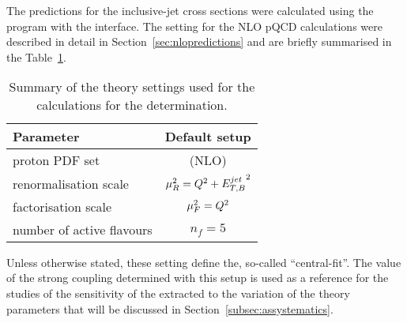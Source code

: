 The predictions for the inclusive-jet cross sections were calculated using the \nlojet program with the \fastnlo interface. The setting for the NLO pQCD calculations were described in detail in Section~\ref{sec:nlopredictions} and are briefly summarised in the Table~\ref{tab:nlosettings}.
\begin{table}[h]
\centering
\begin{tabular}{l|c}
Parameter  & Default setup \\ 
\hline \hline proton PDF set & \herapdf1.5 (NLO) \\
\hline renormalisation scale & $\mu_R^2=\mbox{${Q^2}$} + \mbox{$E_{T,B}^{jet}$}^2$ \\ 
\hline factorisation scale          & $\mu_F^2=\mbox{${Q^2}$} $ \\ 
\hline number of active flavours    & $n_f = 5 $ \\ 
\end{tabular} 
\caption{Summary of the theory settings used for the calculations for the \as determination.}
\label{tab:nlosettings}
\end{table}
Unless otherwise stated, these setting define the, so-called ``central-fit''. The value of the strong coupling determined with this setup is used as a reference for the studies of the sensitivity of the extracted \asz to the variation of the theory parameters that will be discussed in Section~\ref{subsec:assystematics}.

